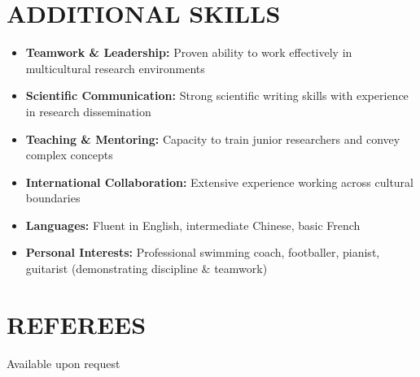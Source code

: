 \documentclass[11pt,a4paper]{article}
\begin{document}
\section{ADDITIONAL SKILLS}
\begin{itemize}[leftmargin=*,noitemsep]
    \item \textbf{Teamwork \& Leadership:} Proven ability to work effectively in multicultural research environments
    \item \textbf{Scientific Communication:} Strong scientific writing skills with experience in research dissemination
    \item \textbf{Teaching \& Mentoring:} Capacity to train junior researchers and convey complex concepts
    \item \textbf{International Collaboration:} Extensive experience working across cultural boundaries
    \item \textbf{Languages:} Fluent in English, intermediate Chinese, basic French
    \item \textbf{Personal Interests:} Professional swimming coach, footballer, pianist, guitarist (demonstrating discipline \& teamwork)
\end{itemize}

\section{REFEREES}
Available upon request
\end{document}
